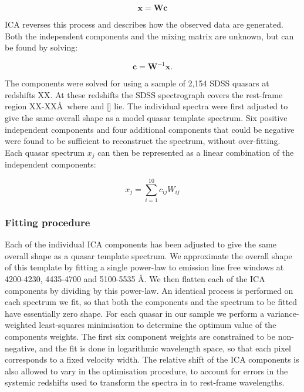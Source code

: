 \begin{equation}
    \bm{x} = \bm{W}\bm{c}
\end{equation}

\ac{ICA} reverses this process and describes how the observed data are generated. 
Both the independent components and the mixing matrix are unknown, but can be found by solving:

\begin{equation}
    \bm{c} = \bm{W}^{-1}\bm{x}.
\end{equation}

The components were solved for using a sample of 2,154 SDSS quasars at redshifts XX. 
At these redshifts the SDSS spectrograph covers the rest-frame region XX-XX\AA\, where \hb and [] lie. 
The individual spectra were first adjusted to give the same overall shape as a model quasar template spectrum.
Six positive independent components and four additional components that could be negative were found to be sufficient to reconstruct the spectrum, without over-fitting. 
Each quasar spectrum $x_j$ can then be represented as a linear combination of the independent components: 

\begin{equation}
    x_j = \sum_{i=1}^{10} c_{ij}W_{ij}
\end{equation}

\subsubsection{Fitting procedure}

Each of the individual \ac{ICA} components has been adjusted to give the same overall shape as a quasar template spectrum. 
We approximate the overall shape of this template by fitting a single power-law to emission line free windows at 4200-4230, 4435-4700 and 5100-5535 \AA. 
We then flatten each of the \ac{ICA} components by dividing by this power-law. 
An identical process is performed on each spectrum we fit, so that both the components and the spectrum to be fitted have essentially zero shape. 
For each quasar in our sample we perform a variance-weighted least-squares minimisation to determine the optimum value of the components weights.
The first six component weights are constrained to be non-negative, and the fit is done in logarithmic wavelength space, so that each pixel corresponds to a fixed velocity width.   
The relative shift of the \ac{ICA} components is also allowed to vary in the optimisation procedure, to account for errors in the systemic redshifts used to transform the spectra in to rest-frame wavelengths. 

